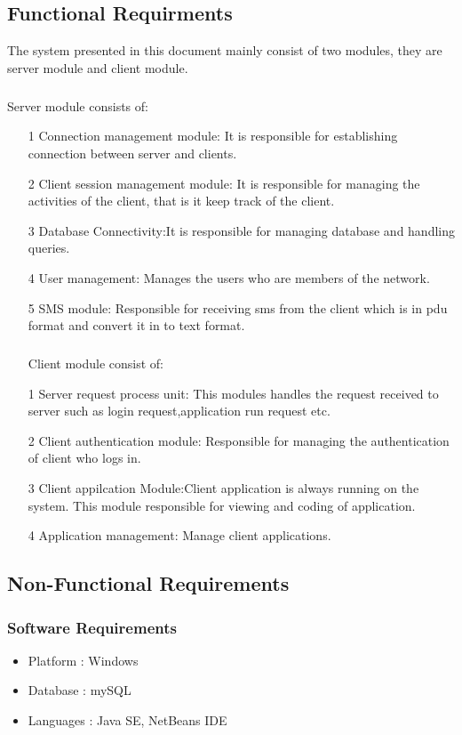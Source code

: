 \subsection{Functional Requirments}
The system presented in this document mainly consist of two modules, they are server
module and client module.
\subparagraph{}
Server module consists of:
\begin{itemize}
\item[1]Connection management module: It is responsible for establishing connection between server and clients.
\item[2]Client session management module: It is responsible for managing the activities of
the client, that is it keep track of the client.
\item[3]Database Connectivity:It is responsible for managing database and handling queries.
\item[4]User management: Manages the users who are members of the network.
\item[5]SMS module: Responsible for receiving sms from the client which is in pdu format
and convert it in to text format.
\subparagraph{}
Client module consist of:
\item[1]Server request process unit: This modules handles the request received to server
such as login request,application run request etc.
\item[2]Client authentication module: Responsible for managing the authentication of client
who logs in.
\item[3]Client appilcation Module:Client application is always running on the system. This module responsible for viewing and coding of application.
\item[4]Application management: Manage client  applications.
\end{itemize}
\subsection{Non-Functional Requirements}
   \subsubsection{Software Requirements}
    \begin{itemize}
     \item Platform : Windows
     \item Database : mySQL
     \item Languages : Java SE, NetBeans IDE
    \end{itemize}       
   
